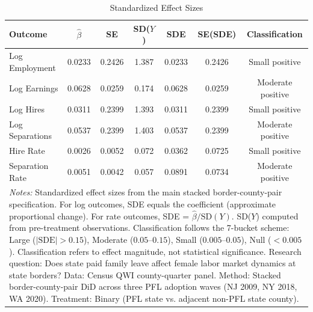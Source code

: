 \begin{table}[htbp]
\centering
\caption{Standardized Effect Sizes}
\label{tab:sde}
\begin{tabular}{lcccccc}
\hline\hline
Outcome & $\hat{\beta}$ & SE & SD($Y$) & SDE & SE(SDE) & Classification \\
\hline
Log Employment & 0.0233 & 0.2426 & 1.387 & 0.0233 & 0.2426 & Small positive \\
Log Earnings & 0.0628 & 0.0259 & 0.174 & 0.0628 & 0.0259 & Moderate positive \\
Log Hires & 0.0311 & 0.2399 & 1.393 & 0.0311 & 0.2399 & Small positive \\
Log Separations & 0.0537 & 0.2399 & 1.403 & 0.0537 & 0.2399 & Moderate positive \\
Hire Rate & 0.0026 & 0.0052 & 0.072 & 0.0362 & 0.0725 & Small positive \\
Separation Rate & 0.0051 & 0.0042 & 0.057 & 0.0891 & 0.0734 & Moderate positive \\
\hline\hline
\multicolumn{7}{p{0.95\textwidth}}{\footnotesize \textit{Notes:} Standardized effect sizes from the main stacked border-county-pair specification. For log outcomes, SDE equals the coefficient (approximate proportional change). For rate outcomes, SDE = $\hat{\beta} / \text{SD}(Y)$. SD($Y$) computed from pre-treatment observations. Classification follows the 7-bucket scheme: Large ($|\text{SDE}| > 0.15$), Moderate ($0.05$--$0.15$), Small ($0.005$--$0.05$), Null ($< 0.005$). Classification refers to effect magnitude, not statistical significance. Research question: Does state paid family leave affect female labor market dynamics at state borders? Data: Census QWI county-quarter panel. Method: Stacked border-county-pair DiD across three PFL adoption waves (NJ 2009, NY 2018, WA 2020). Treatment: Binary (PFL state vs. adjacent non-PFL state county).} \\
\end{tabular}
\end{table}
